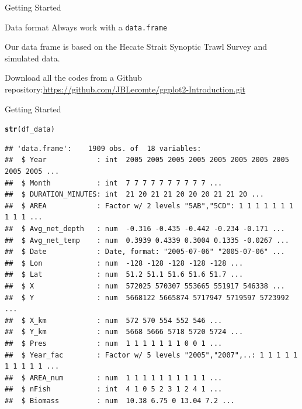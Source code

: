\documentclass{beamer}\usepackage[]{graphicx}\usepackage[]{color}
\makeatletter
\newcommand{\hlstd}[1]{\textcolor[rgb]{0.345,0.345,0.345}{#1}}%
\newcommand{\hlkwd}[1]{\textcolor[rgb]{0.737,0.353,0.396}{\textbf{#1}}}%
\newenvironment{kframe}{%
 \def\at@end@of@kframe{}%
 \ifinner\ifhmode%
  \def\at@end@of@kframe{\end{minipage}}%
  \begin{minipage}{\columnwidth}%
 \fi\fi%
 \def\FrameCommand##1{\hskip\@totalleftmargin \hskip-\fboxsep
 \colorbox{shadecolor}{##1}\hskip-\fboxsep
     \hskip-\linewidth \hskip-\@totalleftmargin \hskip\columnwidth}%
 \MakeFramed {\advance\hsize-\width
   \@totalleftmargin\z@ \linewidth\hsize
   \@setminipage}}%
 {\par\unskip\endMakeFramed%
 \at@end@of@kframe}
\newenvironment{knitrout}{}{} %
\makeatother
\begin{document}
\begin{frame}[fragile]{Getting Started}

\begin{alertblock}{Data format}
Always work with a \texttt{data.frame}
\end{alertblock}

\vspace{1cm}

Our data frame is based on the Hecate Strait Synoptic Trawl Survey and simulated data.
\vspace{1cm}

Download all the codes from a Github repository:\newline \url{https://github.com/JBLecomte/ggplot2-Introduction.git}
\end{frame}

\begin{frame}[fragile]{Getting Started}
\begin{knitrout}\scriptsize
{}\color{fgcolor}\begin{kframe}
\begin{alltt}
\hlkwd{str}\hlstd{(df_data)}
\end{alltt}
\begin{verbatim}
## 'data.frame':	1909 obs. of  18 variables:
##  $ Year            : int  2005 2005 2005 2005 2005 2005 2005 2005 2005 2005 ...
##  $ Month           : int  7 7 7 7 7 7 7 7 7 7 ...
##  $ DURATION_MINUTES: int  21 20 21 21 20 20 20 21 21 20 ...
##  $ AREA            : Factor w/ 2 levels "5AB","5CD": 1 1 1 1 1 1 1 1 1 1 ...
##  $ Avg_net_depth   : num  -0.316 -0.435 -0.442 -0.234 -0.171 ...
##  $ Avg_net_temp    : num  0.3939 0.4339 0.3004 0.1335 -0.0267 ...
##  $ Date            : Date, format: "2005-07-06" "2005-07-06" ...
##  $ Lon             : num  -128 -128 -128 -128 -128 ...
##  $ Lat             : num  51.2 51.1 51.6 51.6 51.7 ...
##  $ X               : num  572025 570307 553665 551917 546338 ...
##  $ Y               : num  5668122 5665874 5717947 5719597 5723992 ...
##  $ X_km            : num  572 570 554 552 546 ...
##  $ Y_km            : num  5668 5666 5718 5720 5724 ...
##  $ Pres            : num  1 1 1 1 1 1 1 0 0 1 ...
##  $ Year_fac        : Factor w/ 5 levels "2005","2007",..: 1 1 1 1 1 1 1 1 1 1 ...
##  $ AREA_num        : num  1 1 1 1 1 1 1 1 1 1 ...
##  $ nFish           : int  4 1 0 5 2 3 1 2 4 1 ...
##  $ Biomass         : num  10.38 6.75 0 13.04 7.2 ...
\end{verbatim}
\end{kframe}
\end{knitrout}
\end{frame}
\end{document}
